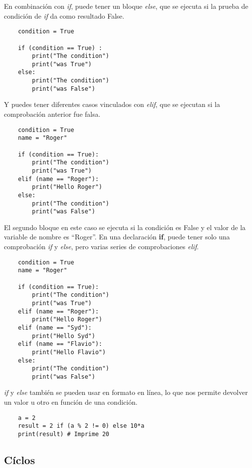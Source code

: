 \documentclass[12pt]{article}
\begin{document}
    En combinación con \textit{if}, puede tener un bloque \textit{else}, que se ejecuta si la prueba de condición de \textit{if} da como resultado False.
    \begin{lstlisting}
    condition = True

    if (condition == True) :
        print("The condition")
        print("was True")
    else:
        print("The condition")
        print("was False")
    \end{lstlisting}

    Y puedes tener diferentes casos vinculados con \textit{elif}, que se ejecutan si la comprobación anterior fue falsa.

    \begin{lstlisting}
    condition = True
    name = "Roger"

    if (condition == True):
        print("The condition")
        print("was True")
    elif (name == "Roger"):
        print("Hello Roger")
    else:
        print("The condition")
        print("was False")
    \end{lstlisting}

    El segundo bloque en este caso se ejecuta si la condición es False y el valor de la variable de nombre es ``Roger''.
    En una declaración \textbf{if}, puede tener solo una comprobación \textit{if} y \textit{else}, pero varias series de comprobaciones \textit{elif}.

    \begin{lstlisting}
    condition = True
    name = "Roger"

    if (condition == True):
        print("The condition")
        print("was True")
    elif (name == "Roger"):
        print("Hello Roger")
    elif (name == "Syd"):
        print("Hello Syd")
    elif (name == "Flavio"):
        print("Hello Flavio")
    else:
        print("The condition")
        print("was False")
    \end{lstlisting}

    \textit{if} y \textit{else} también se pueden usar en formato en línea, lo que nos permite devolver un
    valor u otro en función de una condición.

    \begin{lstlisting}
    a = 2
    result = 2 if (a % 2 != 0) else 10*a
    print(result) # Imprime 20
    \end{lstlisting}


    \subsection{Cíclos}
\end{document}
